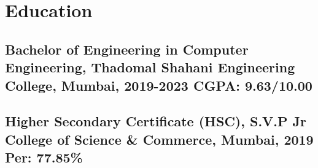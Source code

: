 \documentclass[a4,10pt]{article}
\newcommand{\subtext}[1]{
#1\par\vspace{-0.2cm}}
\newcommand{\hskills}[1]{
\textbf{\bfseries #1} }
\begin{document}



\section{Education }
\subsection*{Bachelor of Engineering in Computer Engineering, {\normalsize \normalfont Thadomal Shahani Engineering College, Mumbai, 2019-2023} \hfill CGPA: 9.63/10.00} 
\vspace{0.1cm}
\subsection*{Higher Secondary Certificate (HSC), {\normalsize \normalfont S.V.P Jr College of Science \& Commerce, Mumbai, 2019} \hfill Per: 77.85\%} 
\vspace{0.1cm}
\end{document}
